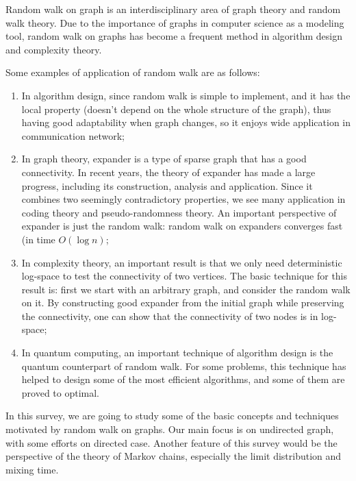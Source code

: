 Random walk on graph is an interdisciplinary area of graph theory
and random walk theory. Due to the importance of graphs in computer
science as a modeling tool, random walk on graphs has become a
frequent method in algorithm design and complexity theory.

Some examples of application of random walk are as follows:

\begin{enumerate}
\item In algorithm design, since random walk is simple to implement,
and it has the local property (doesn't depend on the whole structure
of the graph), thus having good adaptability when graph changes, so
it enjoys wide application in communication network;
\item In graph theory, expander is a type of sparse graph that has a
good connectivity. In recent years, the theory of expander has made
a large progress, including its construction, analysis and
application. Since it combines two seemingly contradictory
properties, we see many application in coding theory and
pseudo-randomness theory. An important perspective of expander is
just the random walk: random walk on expanders converges fast (in
time $O(\log n)$;
\item In complexity theory, an important result is that we only need
deterministic log-space to test the connectivity of two vertices.
The basic technique for this result is: first we start with an
arbitrary graph, and consider the random walk on it. By constructing
good expander from the initial graph while preserving the
connectivity, one can show that the connectivity of two nodes is in
log-space;
\item In quantum computing, an important technique of algorithm
design is the quantum counterpart of random walk. For some problems,
this technique has helped to design some of the most efficient
algorithms, and some of them are proved to optimal.
\end{enumerate}

In this survey, we are going to study some of the basic concepts and
techniques motivated by random walk on graphs. Our main focus is on
undirected graph, with some efforts on directed case. Another
feature of this survey would be the perspective of the theory of
Markov chains, especially the limit distribution and mixing time.
